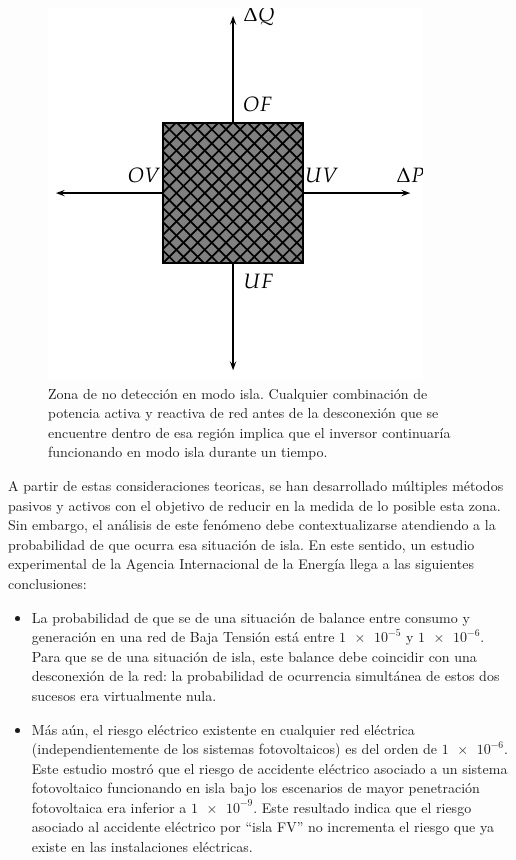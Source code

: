 %
\begin{figure}


\includegraphics{../figs/NDZ}

\caption[Zona de no detección en modo isla.]{Zona de no detección en modo isla. Cualquier combinación de potencia
activa y reactiva de red antes de la desconexión que se encuentre
dentro de esa región implica que el inversor continuaría funcionando
en modo isla durante un tiempo. \label{fig:NDZ}}



\end{figure}


A partir de estas consideraciones teoricas, se han desarrollado múltiples
métodos pasivos y activos con el objetivo de reducir en la medida
de lo posible esta zona. Sin embargo, el análisis de este fenómeno
debe contextualizarse atendiendo a la probabilidad de que ocurra esa
situación de isla. En este sentido, un estudio experimental de la
Agencia Internacional de la Energía \citep{Verhoeven2002,Cullen.Thornycroft.ea2002}
llega a las siguientes conclusiones: 
\begin{itemize}
\item La probabilidad de que se de una situación de balance entre consumo
y generación en una red de Baja Tensión está entre $\num{1e-5}$ y
$\num{1e-6}$. Para que se de una situación de isla, este balance
debe coincidir con una desconexión de la red: la probabilidad de ocurrencia
simultánea de estos dos sucesos era virtualmente nula. 
\item Más aún, el riesgo eléctrico existente en cualquier red eléctrica
(independientemente de los sistemas fotovoltaicos) es del orden de
$\num{1e-6}$. Este estudio mostró que el riesgo de accidente eléctrico
asociado a un sistema fotovoltaico funcionando en isla bajo los escenarios
de mayor penetración fotovoltaica era inferior a $\num{1e-9}$. Este
resultado indica que el riesgo asociado al accidente eléctrico por
\textquotedblleft{}isla FV\textquotedblright{} no incrementa el riesgo
que ya existe en las instalaciones eléctricas. 
\end{itemize}

